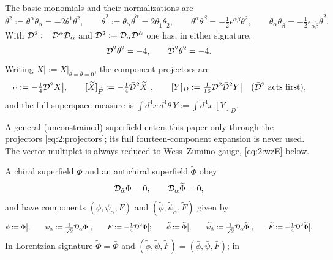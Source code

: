 The basic monomials and their normalizations are
\begin{equation}
\theta^2:=\theta^\alpha\theta_\alpha=-2\theta^1\theta^2,\qquad
\bar\theta^2:=\bar\theta_{\dot\alpha}\bar\theta^{\dot\alpha}
=2\bar\theta_{\dot1}\bar\theta_{\dot2},\qquad
\theta^\alpha\theta^\beta=-\tfrac12\epsilon^{\alpha\beta}\theta^2,\qquad
\bar\theta_{\dot\alpha}\bar\theta_{\dot\beta}
=-\tfrac12\epsilon_{\dot\alpha\dot\beta}\bar\theta^2 .
\label{eq:2:theta2}
\end{equation}
With $\mathcal{D}^2:=\mathcal{D}^\alpha\mathcal{D}_\alpha$ and
$\bar{\mathcal{D}}^2:=\bar{\mathcal{D}}_{\dot\alpha}\bar{\mathcal{D}}^{\dot\alpha}$ one has, in either signature,
\begin{equation}
\mathcal{D}^2\theta^2=-4,\qquad \bar{\mathcal{D}}^2\bar\theta^2=-4 .
\label{eq:2:D2theta2}
\end{equation}
Writing $X|:=X|_{\theta=\bar\theta=0}$, the component projectors are
\begin{equation}
[X]_F:=-\tfrac14\cD^2X\big|,\qquad
[\widetilde X]_{\widetilde F}:=-\tfrac14\bcD^2\widetilde X\big|,\qquad
[Y]_D:=\tfrac1{16}\cD^2\bcD^2Y\big| \quad(\bcD^2\ \text{acts first}),
\label{eq:2:projectors}
\end{equation}
and the full superspace measure is
$\int d^4x\,d^4\theta\,Y:=\int d^4x\,[Y]_D$.
\begin{remark}\label{rem:2:generalsf}
A general (unconstrained) superfield enters this paper only through the
projectors \eqref{eq:2:projectors}; its full fourteen-component expansion is
never used. The vector multiplet is always reduced to Wess--Zumino gauge,
\eqref{eq:2:wzE} below.
\end{remark}
A chiral superfield $\Phi$ and an antichiral superfield $\widetilde\Phi$ obey
\begin{equation}
\bar{\mathcal{D}}_{\dot\alpha}\Phi=0,\qquad \mathcal{D}_\alpha\widetilde\Phi=0 ,
\label{eq:2:chirality}
\end{equation}
and have components $(\phi,\psi_\alpha,F)$ and
$(\widetilde\phi,\widetilde\psi_{\dot\alpha},\widetilde F)$ given by
\begin{equation}
\phi:=\Phi\big|,\qquad
\psi_\alpha:=\tfrac1{\sqrt2}\mathcal{D}_\alpha\Phi\big|,\qquad
F:=-\tfrac14\mathcal{D}^2\Phi\big|;\qquad
\widetilde\phi:=\widetilde\Phi\big|,\qquad
\widetilde\psi_{\dot\alpha}
:=\tfrac1{\sqrt2}\bar{\mathcal{D}}_{\dot\alpha}\widetilde\Phi\big|,\qquad
\widetilde F:=-\tfrac14\bar{\mathcal{D}}^2\widetilde\Phi\big| .
\label{eq:2:chiralcomponents}
\end{equation}
In Lorentzian signature $\widetilde\Phi=\bar\Phi$ and
$(\widetilde\phi,\widetilde\psi,\widetilde F)=(\bar\phi,\bar\psi,\bar F)$; in
